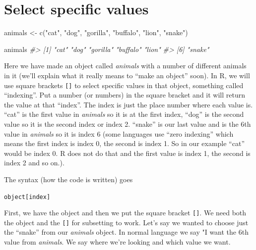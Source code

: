 \documentclass[
  12pt,
  openany]{book}
\newenvironment{Shaded}{\begin{snugshade}}{\end{snugshade}}
\newcommand{\CommentTok}[1]{\textcolor[rgb]{0.37,0.37,0.37}{\textit{#1}}}
\newcommand{\FunctionTok}[1]{\textcolor[rgb]{0,0,0}{#1}}
\newcommand{\NormalTok}[1]{#1}
\newcommand{\OtherTok}[1]{\textcolor[rgb]{0.37,0.37,0.37}{#1}}
\newcommand{\StringTok}[1]{\textcolor[rgb]{0.5,0.5,0.5}{#1}}
\begin{document}
\hypertarget{select-specific-values}{%
\section{Select specific values}\label{select-specific-values}}

\begin{Shaded}
\begin{Highlighting}[]
\NormalTok{animals }\OtherTok{\textless{}{-}} \FunctionTok{c}\NormalTok{(}\StringTok{"cat"}\NormalTok{, }\StringTok{"dog"}\NormalTok{, }\StringTok{"gorilla"}\NormalTok{, }\StringTok{"buffalo"}\NormalTok{, }\StringTok{"lion"}\NormalTok{, }\StringTok{"snake"}\NormalTok{)}
\end{Highlighting}
\end{Shaded}

\begin{Shaded}
\begin{Highlighting}[]
\NormalTok{animals}
\CommentTok{\#\textgreater{} [1] "cat"     "dog"     "gorilla" "buffalo" "lion"   }
\CommentTok{\#\textgreater{} [6] "snake"}
\end{Highlighting}
\end{Shaded}

Here we have made an object called \emph{animals} with a number of different animals in it (we'll explain what it really means to ``make an object'' soon). In R, we will use square brackets \texttt{{[}{]}} to select specific values in that object, something called ``indexing''. Put a number (or numbers) in the square bracket and it will return the value at that ``index''. The index is just the place number where each value is. ``cat'' is the first value in \emph{animals} so it is at the first index, ``dog'' is the second value so it is the second index or index 2. ``snake'' is our last value and is the 6th value in \emph{animals} so it is index 6 (some languages use ``zero indexing'' which means the first index is index 0, the second is index 1. So in our example ``cat'' would be index 0. R does not do that and the first value is index 1, the second is index 2 and so on.).

The syntax (how the code is written) goes

\texttt{object{[}index{]}}

First, we have the object and then we put the square bracket \texttt{{[}{]}}. We need both the object and the \texttt{{[}{]}} for subsetting to work. Let's say we wanted to choose just the ``snake'' from our \emph{animals} object. In normal language we say "I want the 6th value from \emph{animals}. We say where we're looking and which value we want.
\end{document}
